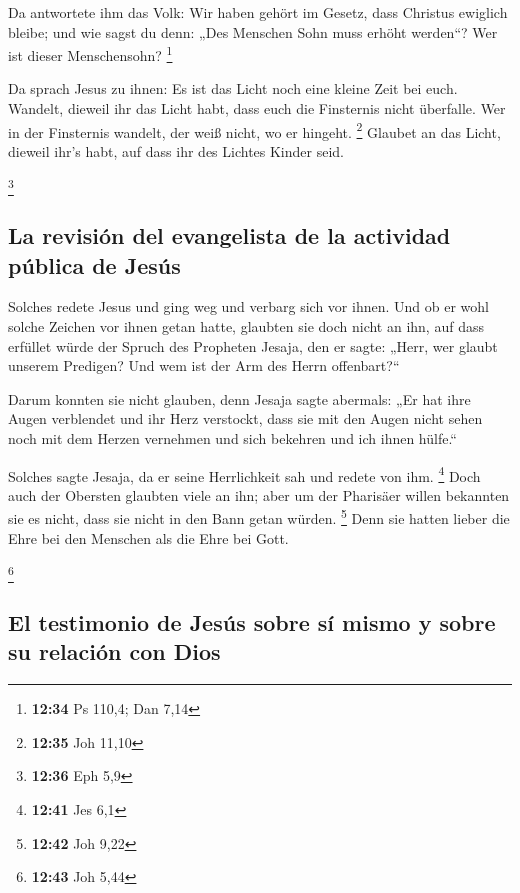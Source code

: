  Da antwortete ihm das Volk: Wir haben gehört im Gesetz,
dass Christus ewiglich bleibe; und wie sagst du denn: „Des Menschen Sohn
muss erhöht werden``? Wer ist dieser Menschensohn? \footnote{\textbf{12:34}
  Ps 110,4; Dan 7,14}

 Da sprach Jesus zu ihnen: Es ist das Licht noch eine
kleine Zeit bei euch. Wandelt, dieweil ihr das Licht habt, dass euch die
Finsternis nicht überfalle. Wer in der Finsternis wandelt, der weiß
nicht, wo er hingeht. \footnote{\textbf{12:35} Joh 11,10}
 Glaubet an das Licht, dieweil ihr's habt, auf dass ihr
des Lichtes Kinder seid.

\footnote{\textbf{12:36} Eph 5,9}

\hypertarget{la-revisiuxf3n-del-evangelista-de-la-actividad-puxfablica-de-jesuxfas}{%
\subsection{La revisión del evangelista de la actividad pública de
Jesús}\label{la-revisiuxf3n-del-evangelista-de-la-actividad-puxfablica-de-jesuxfas}}

 Solches redete Jesus und ging weg und verbarg sich vor
ihnen. Und ob er wohl solche Zeichen vor ihnen getan hatte, glaubten sie
doch nicht an ihn,  auf dass erfüllet würde der Spruch
des Propheten Jesaja, den er sagte: „Herr, wer glaubt unserem Predigen?
Und wem ist der Arm des Herrn offenbart?{}``

 Darum konnten sie nicht glauben, denn Jesaja sagte
abermals:  „Er hat ihre Augen verblendet und ihr Herz
verstockt, dass sie mit den Augen nicht sehen noch mit dem Herzen
vernehmen und sich bekehren und ich ihnen hülfe.``

 Solches sagte Jesaja, da er seine Herrlichkeit sah und
redete von ihm. \footnote{\textbf{12:41} Jes 6,1}  Doch
auch der Obersten glaubten viele an ihn; aber um der Pharisäer willen
bekannten sie es nicht, dass sie nicht in den Bann getan würden.
\footnote{\textbf{12:42} Joh 9,22}  Denn sie hatten
lieber die Ehre bei den Menschen als die Ehre bei Gott.

\footnote{\textbf{12:43} Joh 5,44}

\hypertarget{el-testimonio-de-jesuxfas-sobre-suxed-mismo-y-sobre-su-relaciuxf3n-con-dios}{%
\subsection{El testimonio de Jesús sobre sí mismo y sobre su relación
con
Dios}\label{el-testimonio-de-jesuxfas-sobre-suxed-mismo-y-sobre-su-relaciuxf3n-con-dios}}

